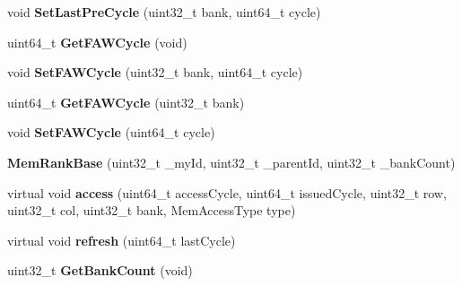 \begin{DoxyCompactItemize}
\item 
\hypertarget{classMemRankBase_a5af10b120b0e024cef6a604502a73780}{void {\bfseries Set\-Last\-Pre\-Cycle} (uint32\-\_\-t bank, uint64\-\_\-t cycle)}\label{classMemRankBase_a5af10b120b0e024cef6a604502a73780}

\item 
\hypertarget{classMemRankBase_afc20190d248a82987c4807713a0b98ee}{uint64\-\_\-t {\bfseries Get\-F\-A\-W\-Cycle} (void)}\label{classMemRankBase_afc20190d248a82987c4807713a0b98ee}

\item 
\hypertarget{classMemRankBase_aee6e9d1eb430ad2778e4d15a664104e5}{void {\bfseries Set\-F\-A\-W\-Cycle} (uint32\-\_\-t bank, uint64\-\_\-t cycle)}\label{classMemRankBase_aee6e9d1eb430ad2778e4d15a664104e5}

\item 
\hypertarget{classMemRankBase_abaed63f78841d8ff3b17c0d118947869}{uint64\-\_\-t {\bfseries Get\-F\-A\-W\-Cycle} (uint32\-\_\-t bank)}\label{classMemRankBase_abaed63f78841d8ff3b17c0d118947869}

\item 
\hypertarget{classMemRankBase_abbdadf20ed4c1a1ce485feff4bff611f}{void {\bfseries Set\-F\-A\-W\-Cycle} (uint64\-\_\-t cycle)}\label{classMemRankBase_abbdadf20ed4c1a1ce485feff4bff611f}

\item 
\hypertarget{classMemRankBase_aacf0992ac12f1a10c2159b7de3f8b464}{{\bfseries Mem\-Rank\-Base} (uint32\-\_\-t \-\_\-my\-Id, uint32\-\_\-t \-\_\-parent\-Id, uint32\-\_\-t \-\_\-bank\-Count)}\label{classMemRankBase_aacf0992ac12f1a10c2159b7de3f8b464}

\item 
\hypertarget{classMemRankBase_a596fce2e8d6b047f4a21474a52dd3cde}{virtual void {\bfseries access} (uint64\-\_\-t access\-Cycle, uint64\-\_\-t issued\-Cycle, uint32\-\_\-t row, uint32\-\_\-t col, uint32\-\_\-t bank, Mem\-Access\-Type type)}\label{classMemRankBase_a596fce2e8d6b047f4a21474a52dd3cde}

\item 
\hypertarget{classMemRankBase_ae21cec9273cd86d7dffcfe78e3f81d2d}{virtual void {\bfseries refresh} (uint64\-\_\-t last\-Cycle)}\label{classMemRankBase_ae21cec9273cd86d7dffcfe78e3f81d2d}

\item 
\hypertarget{classMemRankBase_a8261bb5be377b057348a60817f0b0b42}{uint32\-\_\-t {\bfseries Get\-Bank\-Count} (void)}\label{classMemRankBase_a8261bb5be377b057348a60817f0b0b42}


\end{DoxyCompactItemize}
